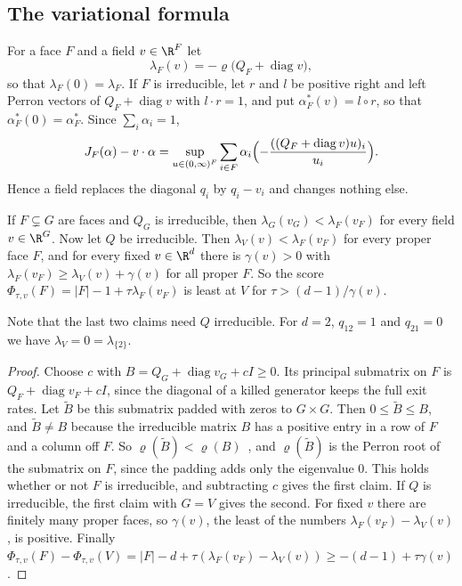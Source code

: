 \subsection{The variational formula}\label{sec:spectral-geometry}

For a face $F$ and a field $v\in\R^F$ let
\begin{equation}\label{eq:lambdaFv}
 \lambda_F(v)=-\varrho\bigl(Q_F+\operatorname{diag}v\bigr),
\end{equation}
so that $\lambda_F(0)=\lambda_F$. If $F$ is irreducible, let $r$ and $l$ be
positive right and left Perron vectors of $Q_F+\operatorname{diag}v$ with
$l\cdot r=1$, and put $\alpha^*_F(v)=l\circ r$, so that $\alpha^*_F(0)=\alpha^*_F$.
Since $\sum_i\alpha_i=1$,
\begin{equation}\label{eq:Jfield}
 J_F(\alpha)-v\cdot\alpha=\sup_{u\in(0,\infty)^F}\sum_{i\in F}\alpha_i
 \Bigl(-\frac{((Q_F+\operatorname{diag}v)u)_i}{u_i}\Bigr).
\end{equation}
Hence a field replaces the diagonal $q_i$ by $q_i-v_i$ and changes nothing else.

\begin{lemma}\label{lem:face-monotone}
If $F\subsetneq G$ are faces and $Q_G$ is irreducible, then
$\lambda_G(v_G)<\lambda_F(v_F)$ for every field $v\in\R^G$. Now let $Q$ be
irreducible. Then $\lambda_V(v)<\lambda_F(v_F)$ for every proper face $F$, and
for every fixed $v\in\R^d$ there is $\gamma(v)>0$ with
$\lambda_F(v_F)\ge\lambda_V(v)+\gamma(v)$ for all proper $F$. So the score
$\Phi_{\tau,v}(F)=|F|-1+\tau\lambda_F(v_F)$ is least at $V$ for
$\tau>(d-1)/\gamma(v)$.
\end{lemma}

Note that the last two claims need $Q$ irreducible. For $d=2$, $q_{12}=1$ and $q_{21}=0$
we have $\lambda_V=0=\lambda_{\{2\}}$.

\begin{proof}
Choose $c$ with $B=Q_G+\operatorname{diag}v_G+cI\ge0$. Its principal submatrix on
$F$ is $Q_F+\operatorname{diag}v_F+cI$, since the diagonal of a killed generator
keeps the full exit rates. Let $\widetilde B$ be this submatrix padded with zeros
to $G\times G$. Then $0\le\widetilde B\le B$, and $\widetilde B\ne B$ because the
irreducible matrix $B$ has a positive entry in a row of $F$ and a column off $F$.
So $\varrho(\widetilde B)<\varrho(B)$~\cite[Ch.~2]{bermanplemmons1994},
and $\varrho(\widetilde B)$ is the Perron root of the submatrix on $F$, since the
padding adds only the eigenvalue $0$. This holds whether or not $F$ is
irreducible, and subtracting $c$ gives the first claim. If $Q$ is irreducible,
the first claim with $G=V$ gives the second. For fixed $v$ there are
finitely many proper faces, so $\gamma(v)$, the least of the numbers
$\lambda_F(v_F)-\lambda_V(v)$, is positive. Finally
$\Phi_{\tau,v}(F)-\Phi_{\tau,v}(V)=|F|-d+\tau(\lambda_F(v_F)-\lambda_V(v))\ge-(d-1)+\tau\gamma(v)$.
\end{proof}

